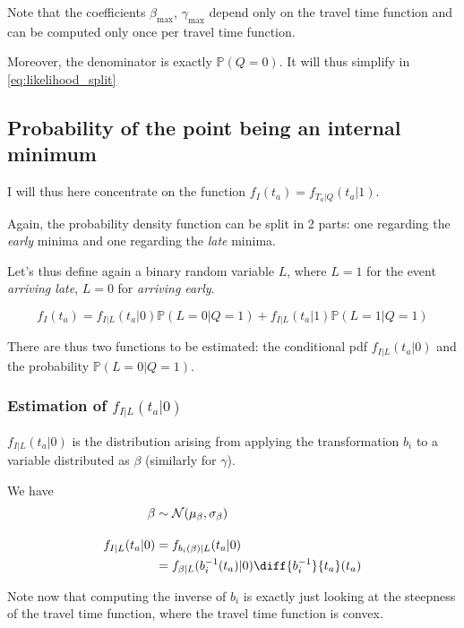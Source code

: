 \documentclass{article}
\begin{document}
Note that the coefficients \(\beta_\text{max}\), \(\gamma_\text{max}\) depend only on the travel time function and can be computed only once per travel time function.

Moreover, the denominator is exactly \(\mathbb{P}(Q = 0)\).
It will thus simplify in \eqref{eq:likelihood_split}

\subsection{Probability of the point being an internal minimum}

I will thus here concentrate on the function \(f_I(t_a) = f_{T_a | Q}(t_a | 1)\).

Again, the probability density function can be split in 2 parts:
one regarding the \textit{early} minima and one regarding the \textit{late} minima.

Let's thus define again a binary random variable \(L\), where \(L=1\) for the event \textit{arriving late}, \(L=0\) for \textit{arriving early}.

\begin{equation}
  \label{eq:internal_split}
  f_I(t_a) = f_{I | L}(t_a | 0) \mathbb{P}(L=0 | Q=1) + f_{I | L}(t_a | 1) \mathbb{P}(L=1 | Q=1)
\end{equation}

There are thus two functions to be estimated:
the conditional pdf \(f_{I | L}(t_a | 0)\) and the probability \(\mathbb{P}(L=0 | Q=1)\).

\subsubsection{Estimation of $f_{I | L}(t_a | 0)$}

\(f_{I | L}(t_a | 0)\) is the distribution arising from applying the transformation \(b_i\) to a variable distributed as \(\beta\) (similarly for \(\gamma\)).

We have
\begin{align}
  \label{eq:pdf_bi}
  \begin{split}
    \beta & \sim \mathcal{N}(\mu_\beta, \sigma_\beta) \\[1em]
    f_{I | L}(t_a | 0) & = f_{b_i(\beta) | L}(t_a | 0) \\
    & = f_{\beta | L}(b_i^{-1}(t_a) | 0)\diff{b_i^{-1}}{t_a}(t_a)
  \end{split}
\end{align}

Note now that computing the inverse of \(b_i\) is exactly just looking at the steepness of the travel time function, where the travel time function is convex.
\end{document}
